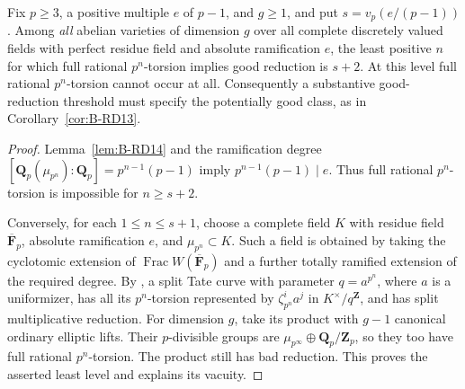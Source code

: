 \begin{proposition}
\label{prop:B-RD15}
Fix $p\geq3$, a positive multiple $e$ of $p-1$, and $g\geq1$, and put
$s=v_p(e/(p-1))$. Among \emph{all} abelian varieties of dimension $g$
over all complete discretely valued fields with perfect residue field
and absolute ramification $e$, the least positive $n$ for which full
rational $p^n$-torsion implies good reduction is $s+2$.
At this level full rational $p^n$-torsion cannot occur at all.
Consequently a substantive good-reduction threshold must specify the
potentially good class, as in Corollary~\ref{cor:B-RD13}.
\end{proposition}
\begin{proof}
Lemma~\ref{lem:B-RD14} and the ramification degree
$[\mathbf Q_p(\mu_{p^n}):\mathbf Q_p]=p^{n-1}(p-1)$ imply
$p^{n-1}(p-1)\mid e$. Thus full rational $p^n$-torsion is impossible
for $n\geq s+2$.

Conversely, for each $1\leq n\leq s+1$, choose a complete field $K$
with residue field $\overline{\mathbf F}_p$, absolute ramification $e$,
and $\mu_{p^n}\subset K$. Such a field is obtained by taking the
cyclotomic extension of $\operatorname{Frac}W(\overline{\mathbf F}_p)$
and a further totally ramified extension of the required degree.
By \cite[Theorem~1, p.6 of the author version]{Tate1995Uniformization},
a split Tate curve with parameter $q=a^{p^n}$, where $a$ is a
uniformizer, has all its $p^n$-torsion represented by
$\zeta_{p^n}^i a^j$ in $K^\times/q^{\mathbf Z}$, and has split
multiplicative reduction. For dimension $g$, take its product with
$g-1$ canonical ordinary elliptic lifts. Their $p$-divisible groups
are $\mu_{p^\infty}\oplus\mathbf Q_p/\mathbf Z_p$, so they too have
full rational $p^n$-torsion. The product still has bad reduction.
This proves the asserted least level and explains its vacuity.
\end{proof}

